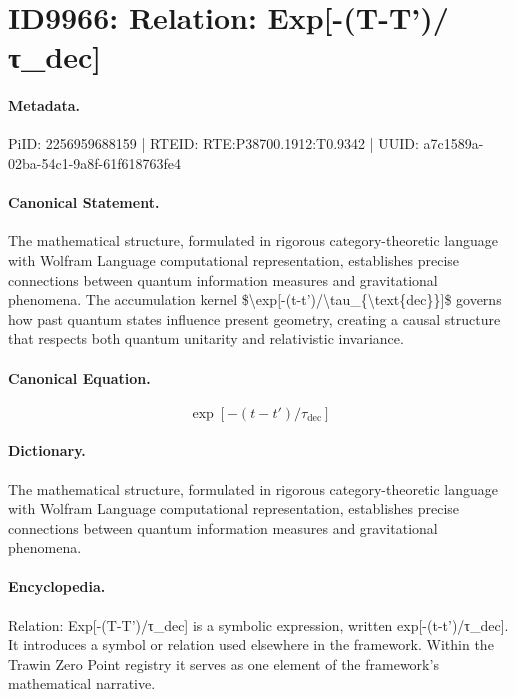\section*{ID9966: Relation: Exp[-(T-T')/τ\_dec]}
\paragraph{Metadata.}
PiID: 2256959688159 | RTEID: RTE:P38700.1912:T0.9342 | UUID: a7c1589a-02ba-54c1-9a8f-61f618763fe4

\paragraph{Canonical Statement.}
The mathematical structure, formulated in rigorous category-theoretic language with Wolfram Language computational representation, establishes precise connections between quantum information measures and gravitational phenomena. The accumulation kernel \$\textbackslash{}exp[-(t-t')/\textbackslash{}tau\_\{\textbackslash{}text\{dec\}\}]\$ governs how past quantum states influence present geometry, creating a causal structure that respects both quantum unitarity and relativistic invariance.

\paragraph{Canonical Equation.}
\[
\exp[-(t-t')/\tau_{\text{dec}}]
\]

\paragraph{Dictionary.}
The mathematical structure, formulated in rigorous category-theoretic language with Wolfram Language computational representation, establishes precise connections between quantum information measures and gravitational phenomena.

\paragraph{Encyclopedia.}
Relation: Exp[-(T-T')/τ\_dec] is a symbolic expression, written exp[-(t-t')/τ\_dec]. It introduces a symbol or relation used elsewhere in the framework. Within the Trawin Zero Point registry it serves as one element of the framework's mathematical narrative.
